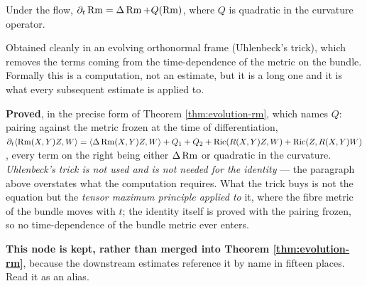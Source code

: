 \begin{lemma}
  \label{lem:evolution-rm}
  \leanok
  Under the flow, $\partial_t \operatorname{Rm} = \Delta \operatorname{Rm} + Q(\operatorname{Rm})$, where $Q$ is
  quadratic in the curvature operator.

  Obtained cleanly in an evolving orthonormal frame (Uhlenbeck's trick), which
  removes the terms coming from the time-dependence of the metric on the
  bundle. Formally this is a computation, not an estimate, but it is a long one
  and it is what every subsequent estimate is applied to.

  \textbf{Proved}, in the precise form of Theorem \ref{thm:evolution-rm}, which
  names $Q$: pairing against the metric frozen at the time of differentiation,
  $\partial_t\langle\operatorname{Rm}(X,Y)Z,W\rangle = \langle\Delta\operatorname{Rm}(X,Y)Z,W\rangle + Q_1 +
  Q_2 + \operatorname{Ric}(R(X,Y)Z,W) + \operatorname{Ric}(Z,R(X,Y)W)$, every term on the right being either
  $\Delta\operatorname{Rm}$ or quadratic in the curvature. \emph{Uhlenbeck's trick is not used
  and is not needed for the identity} --- the paragraph above overstates what the
  computation requires. What the trick buys is not the equation but the
  \emph{tensor maximum principle applied to} it, where the fibre metric of the
  bundle moves with $t$; the identity itself is proved with the pairing frozen,
  so no time-dependence of the bundle metric ever enters.

  \textbf{This node is kept, rather than merged into Theorem
  \ref{thm:evolution-rm}}, because the downstream estimates reference it by name
  in fifteen places. Read it as an alias.
\end{lemma}


